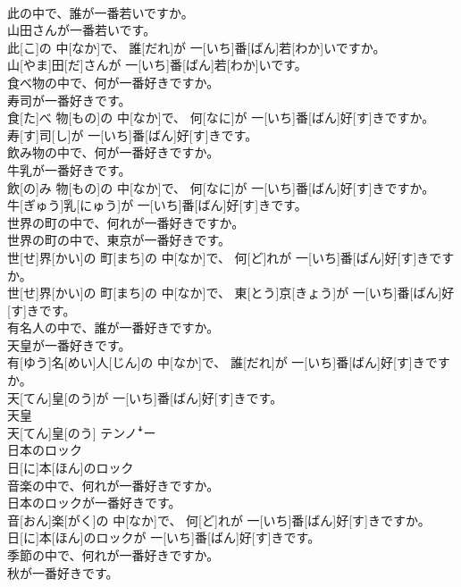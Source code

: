 \documentclass[8pt]{extreport}
\begin{document}
\begin{CJK}{UTF8}{min}
\\	此の中で、誰が一番若いですか。 
\\	山田さんが一番若いです。	
\\	此[こ]の 中[なか]で、 誰[だれ]が 一[いち]番[ばん]若[わか]いですか。 
\\	山[やま]田[だ]さんが 一[いち]番[ばん]若[わか]いです。
\\	食べ物の中で、何が一番好きですか。 
\\	寿司が一番好きです。	
\\	食[た]べ 物[もの]の 中[なか]で、 何[なに]が 一[いち]番[ばん]好[す]きですか。 
\\	寿[す]司[し]が 一[いち]番[ばん]好[す]きです。
\\	飲み物の中で、何が一番好きですか。 
\\	牛乳が一番好きです。	
\\	飲[の]み 物[もの]の 中[なか]で、 何[なに]が 一[いち]番[ばん]好[す]きですか。 
\\	牛[ぎゅう]乳[にゅう]が 一[いち]番[ばん]好[す]きです。
\\	世界の町の中で、何れが一番好きですか。 
\\	世界の町の中で、東京が一番好きです。	
\\	世[せ]界[かい]の 町[まち]の 中[なか]で、 何[ど]れが 一[いち]番[ばん]好[す]きですか。 
\\	世[せ]界[かい]の 町[まち]の 中[なか]で、 東[とう]京[きょう]が 一[いち]番[ばん]好[す]きです。
\\	有名人の中で、誰が一番好きですか。 
\\	天皇が一番好きです。	
\\	有[ゆう]名[めい]人[じん]の 中[なか]で、 誰[だれ]が 一[いち]番[ばん]好[す]きですか。 
\\	天[てん]皇[のう]が 一[いち]番[ばん]好[す]きです。
\\	天皇	
\\	天[てん]皇[のう]	テンノꜜー
\\	日本のロック	
\\	日[に]本[ほん]のロック	
\\	音楽の中で、何れが一番好きですか。 
\\	日本のロックが一番好きです。	
\\	音[おん]楽[がく]の 中[なか]で、 何[ど]れが 一[いち]番[ばん]好[す]きですか。 
\\	日[に]本[ほん]のロックが 一[いち]番[ばん]好[す]きです。
\\	季節の中で、何れが一番好きですか。 
\\	秋が一番好きです。	

\end{CJK}
\end{document}
